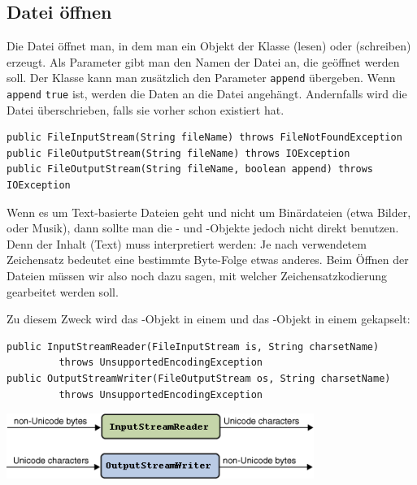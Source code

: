 \subsection{Datei öffnen}

Die Datei öffnet man, in dem man ein Objekt der Klasse 
(lesen) oder  (schreiben) erzeugt. Als Parameter gibt
man den Namen der Datei an, die geöffnet werden soll. Der Klasse
 kann man zusätzlich den Parameter \lstinline|append|
übergeben. Wenn \lstinline|append| \lstinline|true| ist, werden die Daten an die
Datei angehängt. Andernfalls wird die Datei überschrieben, falls sie
vorher schon existiert hat.

\begin{lstlisting}
public FileInputStream(String fileName) throws FileNotFoundException
public FileOutputStream(String fileName) throws IOException
public FileOutputStream(String fileName, boolean append) throws IOException
\end{lstlisting}

Wenn es um Text-basierte Dateien geht und nicht um Binärdateien (etwa Bilder,
oder Musik), dann sollte man die - und
-Objekte jedoch nicht direkt benutzen. Denn der Inhalt
(Text) muss interpretiert werden: Je nach verwendetem Zeichensatz bedeutet eine
bestimmte Byte-Folge etwas anderes. Beim Öffnen der Dateien müssen wir also noch
dazu sagen, mit welcher Zeichensatzkodierung gearbeitet werden soll.

Zu diesem Zweck wird das -Objekt in einem
 und das -Objekt in einem
 gekapselt:

\begin{lstlisting}
public InputStreamReader(FileInputStream is, String charsetName) 
         throws UnsupportedEncodingException
public OutputStreamWriter(FileOutputStream os, String charsetName) 
         throws UnsupportedEncodingException
\end{lstlisting}

\begin{center}
\includegraphics[width=0.75\textwidth]{./inf/SEKII/27_Java_Dateizugriffe/Stream-Kapselung.png}
\end{center}

